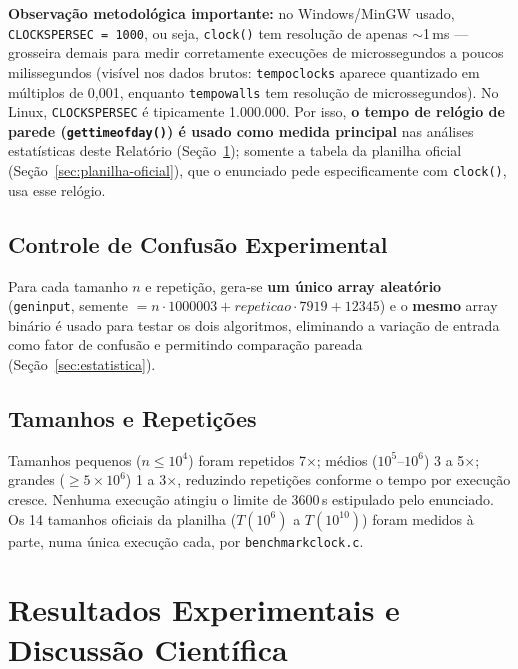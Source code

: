 \documentclass[11pt,a4paper]{article}
\renewcommand{\_}{\underscoreoriginal\allowbreak}
\begin{document}
\textbf{Observação metodológica importante:} no Windows/MinGW usado,
\texttt{CLOCKS\_PER\_SEC = 1000}, ou seja, \texttt{clock()} tem
resolução de apenas $\sim$1\,ms --- grosseira demais para medir
corretamente execuções de microssegundos a poucos milissegundos (visível
nos dados brutos: \texttt{tempo\_clock\_s} aparece quantizado em
múltiplos de 0,001, enquanto \texttt{tempo\_wall\_s} tem resolução de
microssegundos). No Linux, \texttt{CLOCKS\_PER\_SEC} é tipicamente
1.000.000. Por isso, \textbf{o tempo de relógio de parede
(\texttt{gettimeofday()}) é usado como medida principal} nas análises
estatísticas deste Relatório (Seção~\ref{sec:resultados}); somente a
tabela da planilha oficial (Seção~\ref{sec:planilha-oficial}), que o
enunciado pede especificamente com \texttt{clock()}, usa esse relógio.

\subsection{Controle de Confusão Experimental}

Para cada tamanho $n$ e repetição, gera-se \textbf{um único array
aleatório} (\texttt{gen\_input}, semente $= n\cdot1000003 +
\mathit{repeticao}\cdot7919 + 12345$) e o \textbf{mesmo} array binário é
usado para testar os dois algoritmos, eliminando a variação de entrada
como fator de confusão e permitindo comparação pareada
(Seção~\ref{sec:estatistica}).

\subsection{Tamanhos e Repetições}

Tamanhos pequenos ($n\le10^4$) foram repetidos 7$\times$; médios
($10^5$--$10^6$) 3 a 5$\times$; grandes ($\ge5\times10^6$) 1 a
3$\times$, reduzindo repetições conforme o tempo por execução cresce.
Nenhuma execução atingiu o limite de 3600\,s estipulado pelo enunciado.
Os 14 tamanhos oficiais da planilha ($T(10^6)$ a $T(10^{10})$) foram
medidos à parte, numa única execução cada, por \texttt{benchmark\_clock.c}.

\section{Resultados Experimentais e Discussão Científica}
\label{sec:resultados}
\end{document}
